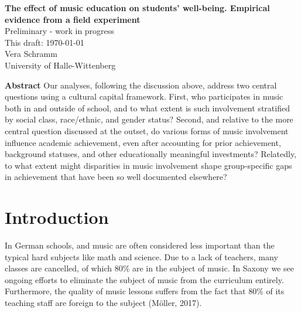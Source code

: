 \documentclass[a4, 12pt]{article}
\begin{document}
\begin{titlepage}
\thispagestyle{empty}%
\begin{center}
\renewcommand{\baselinestretch}{1.0}\normalsize %
\textbf{
The effect of music education on students' well-being. Empirical evidence from a field experiment}\\[1cm]
Preliminary - work in progress \\[1cm]
This draft: \today \\[1cm]
Vera Schramm \\
University of Halle-Wittenberg \\[0.75cm]
 \end{center}


\end{titlepage}

\renewcommand{\baselinestretch}{1}\normalsize

\textbf{\normalsize Abstract}
Our analyses, following the discussion above, address two central questions
using a cultural capital framework. First, who participates in music
both in and outside of school, and to what extent is such involvement
stratified by social class, race/ethnic, and gender status? Second, and relative
to the more central question discussed at the outset, do various forms of
music involvement influence academic achievement, even after accounting
for prior achievement, background statuses, and other educationally meaningful
investments? Relatedly, to what extent might disparities in music
involvement shape group-specific gaps in achievement that have been so well
documented elsewhere?

\clearpage
\tableofcontents

\clearpage
\doublespacing
\pagestyle{plain}

\hypertarget{introduction}{%
\section{Introduction}\label{introduction}}

\label{sec:introduction}

In German schools, and music are often considered less important than the typical hard subjects like math and science. Due to a lack of teachers, many classes are cancelled, of which 80\% are in the subject of music. In Saxony we see ongoing efforts to eliminate the subject of music from the curriculum entirely. Furthermore, the quality of music lessons suffers from the fact that 80\% of its teaching staff are foreign to the subject (Möller, 2017).
\end{document}
